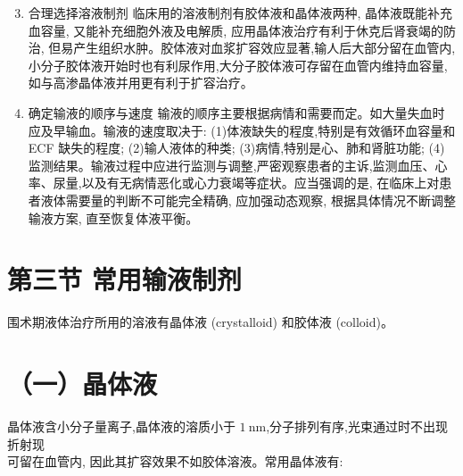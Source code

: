 \documentclass[10pt]{article}
\begin{document}
\begin{enumerate}
  \setcounter{enumi}{2}
  \item 合理选择溶液制剂 临床用的溶液制剂有胶体液和晶体液两种, 晶体液既能补充血容量, 又能补充细胞外液及电解质, 应用晶体液治疗有利于休克后肾衰竭的防治, 但易产生组织水肿。胶体液对血浆扩容效应显著,输人后大部分留在血管内, 小分子胶体液开始时也有利尿作用,大分子胶体液可存留在血管内维持血容量, 如与高渗晶体液并用更有利于扩容治疗。

  \item 确定输液的顺序与速度 输液的顺序主要根据病情和需要而定。如大量失血时应及早输血。输液的速度取决于: (1)体液缺失的程度,特别是有效循环血容量和 ECF 缺失的程度; (2)输人液体的种类; (3)病情,特别是心、肺和肾脏功能; (4)监测结果。输液过程中应进行监测与调整,严密观察患者的主诉,监测血压、心率、尿量,以及有无病情恶化或心力衰竭等症状。应当强调的是, 在临床上对患者液体需要量的判断不可能完全精确, 应加强动态观察, 根据具体情况不断调整输液方案, 直至恢复体液平衡。

\end{enumerate}

\section*{第三节 常用输液制剂}
围术期液体治疗所用的溶液有晶体液 (crystalloid) 和胶体液 (colloid)。

\section*{（一）晶体液}
晶体液含小分子量离子,晶体液的溶质小于 $1 \mathrm{~nm}$,分子排列有序,光束通过时不出现折射现\\
可留在血管内, 因此其扩容效果不如胶体溶液。常用晶体液有:
\end{document}
